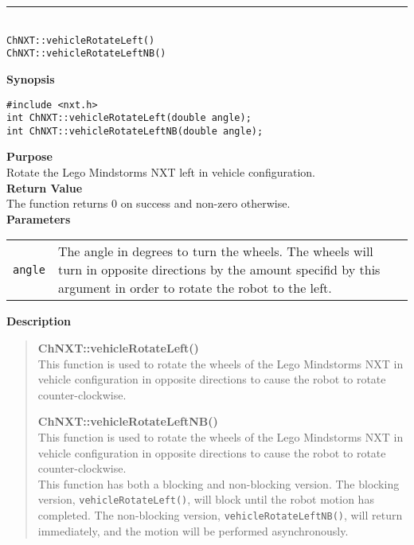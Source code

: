 \noindent
\vspace{5pt}
\rule{4.5in}{0.015in}\\
\noindent
{\LARGE \texttt{ChNXT::vehicleRotateLeft()}}\\
{\LARGE \texttt{ChNXT::vehicleRotateLeftNB()}}\\
{}

\noindent
{\bf Synopsis}
\vspace{-8pt}
\begin{verbatim}
#include <nxt.h>
int ChNXT::vehicleRotateLeft(double angle);
int ChNXT::vehicleRotateLeftNB(double angle);
\end{verbatim}

\noindent
{\bf Purpose}\\
Rotate the Lego Mindstorms NXT left in vehicle configuration.\\

\noindent
{\bf Return Value}\\
The function returns 0 on success and non-zero otherwise.\\

\noindent
{\bf Parameters}\\
\vspace{-0.1in}
\begin{description}
\item               
\begin{tabular}{p{10 mm}p{145 mm}}
\texttt{angle} & The angle in degrees to turn the wheels. The wheels will turn 
    in opposite directions by the amount specifid by this argument in order to 
    rotate the robot to the left. \\
\end{tabular}
\end{description}

\noindent
{\bf Description}\\
\vspace{-12pt}
\begin{quote}
{\bf ChNXT::vehicleRotateLeft()}\\
This function is used to rotate the wheels of the Lego Mindstorms NXT in vehicle configuration in opposite directions to cause the robot to rotate counter-clockwise.

{\bf ChNXT::vehicleRotateLeftNB()}\\
This function is used to rotate the wheels of the Lego Mindstorms NXT in vehicle configuration in opposite directions to cause the robot to rotate counter-clockwise.\\
\newline
This function has both a blocking and non-blocking version.
The blocking version, \texttt{vehicleRotateLeft()}, will block until the
robot motion has completed. The non-blocking version, \texttt{vehicleRotateLeftNB()},
will return immediately, and the motion will be performed asynchronously.\\
\end{quote}

